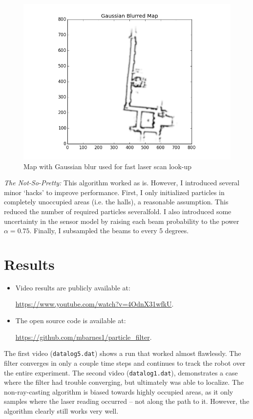 \documentclass[11pt]{amsart}
\begin{document}
\begin{figure}[t]
\centering
	\label{gaussian_map}
        \includegraphics[totalheight=8cm]{gaussian_map.png}
        \caption{Map with Gaussian blur used for fast laser scan look-up}
\end{figure}


\emph{The Not-So-Pretty:}
This algorithm worked as is. However, I introduced several minor `hacks' to improve performance. First, I only initialized particles in completely unoccupied areas (i.e. the halls), a reasonable assumption. This reduced the number of required particles severalfold. I also introduced some uncertainty in the sensor model by raising each beam probability to the power $\alpha = 0.75$. Finally, I subsampled the beams to every 5 degrees.

\section{Results}
\begin{itemize}
\item Video results are publicly available at:
 
\url{https://www.youtube.com/watch?v=4OdnX31wfkU}.
\item The open source code is available at:

 \url{https://github.com/mbarnes1/particle_filter}.
\end{itemize}
The first video (\verb!datalog5.dat!) shows a run that worked almost flawlessly. The filter converges in only a couple time steps and continues to track the robot over the entire experiment. The second video (\verb!datalog1.dat!), demonstrates a case where the filter had trouble converging, but ultimately was able to localize. The non-ray-casting algorithm is biased towards highly occupied areas, as it only samples where the laser reading occurred -- not along the path to it. However, the algorithm clearly still works very well.
\end{document}
